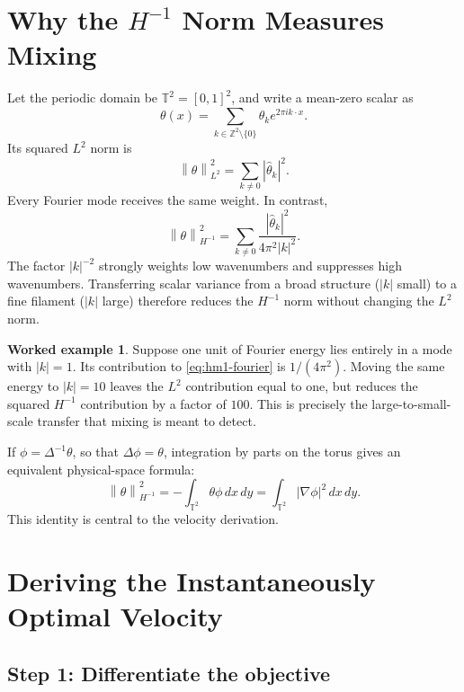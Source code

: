 \documentclass[12pt,a4paper]{article}
\newcommand{\norm}[1]{\left\lVert#1\right\rVert}
\newcommand{\Torus}{\mathbb{T}^2}
\newcommand{\Lap}{\Delta}
\newcommand{\lapinv}{\Delta^{-1}}
\newcommand{\dx}{\,dx\,dy}
\theoremstyle{definition}
\newtheorem{example}{Worked example}[section]
\begin{document}
\section{Why the \texorpdfstring{$H^{-1}$}{H-1} Norm Measures Mixing}

Let the periodic domain be $\Torus=[0,1]^2$, and write a mean-zero scalar as
\begin{equation}
  \theta(x)=\sum_{k\in\mathbb{Z}^2\setminus\{0\}}
  \widehat\theta_k e^{2\pi i k\cdot x}.
\end{equation}
Its squared $L^2$ norm is
\begin{equation}
  \norm{\theta}_{L^2}^2=\sum_{k\ne0}|\widehat\theta_k|^2.
\end{equation}
Every Fourier mode receives the same weight. In contrast,
\begin{equation}
  \norm{\theta}_{H^{-1}}^2
  =\sum_{k\ne0}\frac{|\widehat\theta_k|^2}{4\pi^2|k|^2}.
  \label{eq:hm1-fourier}
\end{equation}
The factor $|k|^{-2}$ strongly weights low wavenumbers and suppresses high
wavenumbers. Transferring scalar variance from a broad structure
($|k|$ small) to a fine filament ($|k|$ large) therefore reduces the
$H^{-1}$ norm without changing the $L^2$ norm.

\begin{example}
Suppose one unit of Fourier energy lies entirely in a mode with $|k|=1$.
Its contribution to \eqref{eq:hm1-fourier} is $1/(4\pi^2)$. Moving the same
energy to $|k|=10$ leaves the $L^2$ contribution equal to one, but reduces
the squared $H^{-1}$ contribution by a factor of $100$. This is precisely
the large-to-small-scale transfer that mixing is meant to detect.
\end{example}

If $\phi=\lapinv\theta$, so that $\Lap\phi=\theta$, integration by parts on
the torus gives an equivalent physical-space formula:
\begin{equation}
  \norm{\theta}_{H^{-1}}^2
  =-\int_{\Torus}\theta\phi\dx
  =\int_{\Torus}|\nabla\phi|^2\dx.
  \label{eq:hm1-physical}
\end{equation}
This identity is central to the velocity derivation.

\section{Deriving the Instantaneously Optimal Velocity}

\subsection{Step 1: Differentiate the objective}
\end{document}
